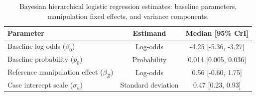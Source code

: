 \begin{table}[!ht]\centering\footnotesize
\caption{Bayesian hierarchical logistic regression estimates: baseline parameters, manipulation fixed effects, and variance components.}\label{tab:global}
\begin{tabularx}{\columnwidth}{@{}X c c@{}}\toprule
Parameter & Estimand & Median [95\% CrI] \\
\midrule
Baseline log-odds ($\beta_0$) & Log-odds & -4.25 [-5.36, -3.27] \\
Baseline probability ($p_0$) & Probability & 0.014 [0.005, 0.036] \\
Reference manipulation effect ($\beta_Z$) & Log-odds & 0.56 [-0.60, 1.75] \\
Case intercept scale ($\sigma_u$) & Standard deviation & 0.47 [0.23, 0.93] \\
\bottomrule\end{tabularx}
\end{table}

